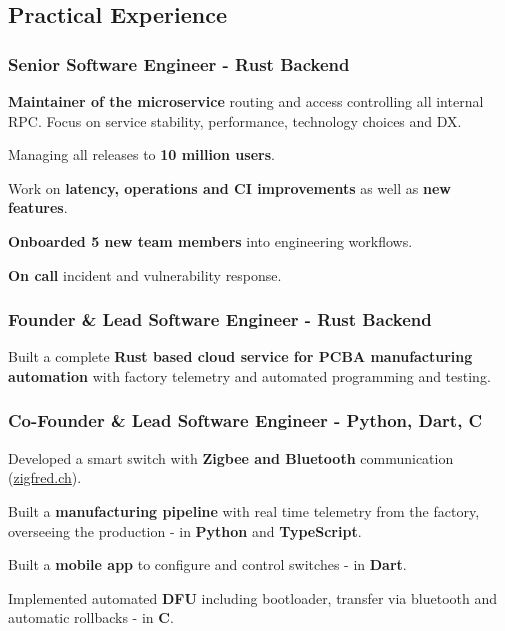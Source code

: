     \begin{timeline}
    
    
    \subsection{Practical Experience}

    \subsubsection{Senior Software Engineer - Rust Backend}
    \textbf{Maintainer of the microservice} routing and access controlling all internal RPC.
    Focus on service stability, performance, technology choices and DX.
    \begin{tightemize}
        \item Managing all releases to \textbf{10 million users}.
        \item Work on \textbf{latency, operations and CI improvements} as well as \textbf{new features}.
        \item \textbf{Onboarded 5 new team members} into engineering workflows.
        \item \textbf{On call} incident and vulnerability response.
    \end{tightemize}
    \sectionsep

    \subsubsection{Founder \& Lead Software Engineer - Rust Backend}
    Built a complete \textbf{Rust based cloud service for PCBA manufacturing automation}
    with factory telemetry and automated programming and testing.
    \sectionsep

    \subsubsection{Co-Founder \& Lead Software Engineer - Python, Dart, C}
    Developed a smart switch with \textbf{Zigbee and Bluetooth} communication (\href{https://zigfred.ch}{zigfred.ch}).
    \begin{tightemize}
        \item Built a \textbf{manufacturing pipeline} with real time telemetry from the factory,
        overseeing the production - in \textbf{Python} and \textbf{TypeScript}.
        \item Built a \textbf{mobile app} to configure and control switches - in \textbf{Dart}. 
        \item Implemented automated \textbf{DFU} including bootloader, transfer via bluetooth and automatic rollbacks - in \textbf{C}.
    \end{tightemize}
    \sectionsep
    

\end{timeline}
